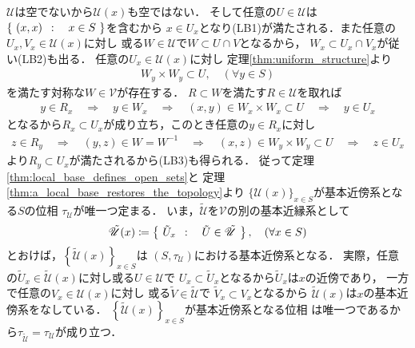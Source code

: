 	\begin{prf}
		$\mathscr{U}$は空でないから$\mathscr{U}(x)$も空ではない．
		そして任意の$U \in \mathscr{U}$は$\left\{\ (x,x)\ \, : \quad x \in S\ \right\}$を含むから
		$x \in U_x$となり(LB1)が満たされる．また任意の$U_x,V_x \in \mathscr{U}(x)$に対し
		或る$W \in \mathscr{U}$で$W \subset U \cap V$となるから，
		$W_x \subset U_x \cap V_x$が従い(LB2)も出る．
		任意の$U_x \in \mathscr{U}(x)$に対し
		定理\ref{thm:uniform_structure}より
		\begin{align}
			W_y \times W_y \subset U,\quad (\forall y \in S)
		\end{align}
		を満たす対称な$W \in \mathscr{V}$が存在する．
		$R \subset W$を満たす$R \in \mathscr{U}$を取れば
		\begin{align}
			y \in R_x \quad \Longrightarrow \quad
			y \in W_x \quad \Longrightarrow \quad
			(x,y) \in W_x \times W_x \subset U \quad \Longrightarrow \quad
			y \in U_x
		\end{align}
		となるから$R_x \subset U_x$が成り立ち，このとき任意の$y \in R_x$に対し
		\begin{align}
			z \in R_y \quad \Longrightarrow \quad
			(y,z) \in W = W^{-1} \quad \Longrightarrow \quad
			(x,z) \in W_y \times W_y \subset U \quad \Longrightarrow \quad
			z \in U_x
		\end{align}
		より$R_y \subset U_x$が満たされるから(LB3)も得られる．
		従って定理\ref{thm:local_base_defines_open_sets}と
		定理\ref{thm:a_local_base_restores_the_topology}より
		$\{\mathscr{U}(x)\}_{x \in S}$が基本近傍系となる$S$の位相
		$\tau_{\mathscr{U}}$が唯一つ定まる．
		いま，$\tilde{\mathscr{U}}$を$\mathscr{V}$の別の基本近縁系として
		\begin{align}
			\tilde{\mathscr{U}}(x) \coloneqq \left\{\ \tilde{U}_x\ \, : \quad \tilde{U} \in \tilde{\mathscr{U}}\ \right\},
			\quad (\forall x \in S)
		\end{align}
		とおけば，$\left\{\tilde{\mathscr{U}}(x)\right\}_{x \in S}$は
		$(S,\tau_{\mathscr{U}})$における基本近傍系となる．
		実際，任意の$\tilde{U}_x \in \tilde{\mathscr{U}}(x)$に対し或る$U \in \mathscr{U}$で
		$U_x \subset \tilde{U}_x$となるから$\tilde{U}_x$は$x$の近傍であり，
		一方で任意の$V_x \in \mathscr{U}(x)$に対し
		或る$\tilde{V} \in \tilde{\mathscr{U}}$で
		$\tilde{V}_x \subset V_x$となるから
		$\tilde{\mathscr{U}}(x)$は$x$の基本近傍系をなしている．
		$\left\{\tilde{\mathscr{U}}(x)\right\}_{x \in S}$が基本近傍系となる位相
		は唯一つであるから$\tau_{\tilde{\mathscr{U}}} = \tau_{\mathscr{U}}$が成り立つ．
		\QED
	\end{prf}
	
